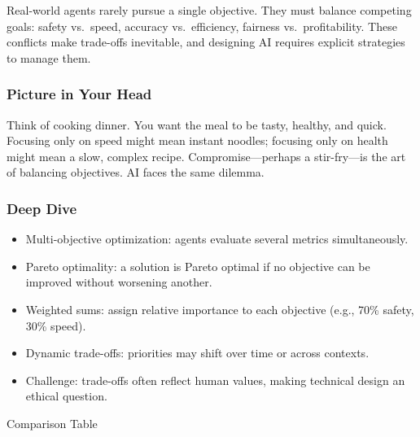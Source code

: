 \documentclass[
  letterpaper,
  DIV=11,
  numbers=noendperiod]{scrreprt}
\providecommand{\tightlist}{%
  \setlength{\itemsep}{0pt}\setlength{\parskip}{0pt}}
\begin{document}
Real-world agents rarely pursue a single objective. They must balance
competing goals: safety vs.~speed, accuracy vs.~efficiency, fairness
vs.~profitability. These conflicts make trade-offs inevitable, and
designing AI requires explicit strategies to manage them.

\subsubsection{Picture in Your Head}\label{picture-in-your-head-14}

Think of cooking dinner. You want the meal to be tasty, healthy, and
quick. Focusing only on speed might mean instant noodles; focusing only
on health might mean a slow, complex recipe. Compromise---perhaps a
stir-fry---is the art of balancing objectives. AI faces the same
dilemma.

\subsubsection{Deep Dive}\label{deep-dive-14}

\begin{itemize}
\tightlist
\item
  Multi-objective optimization: agents evaluate several metrics
  simultaneously.
\item
  Pareto optimality: a solution is Pareto optimal if no objective can be
  improved without worsening another.
\item
  Weighted sums: assign relative importance to each objective (e.g.,
  70\% safety, 30\% speed).
\item
  Dynamic trade-offs: priorities may shift over time or across contexts.
\item
  Challenge: trade-offs often reflect human values, making technical
  design an ethical question.
\end{itemize}

Comparison Table
\end{document}
